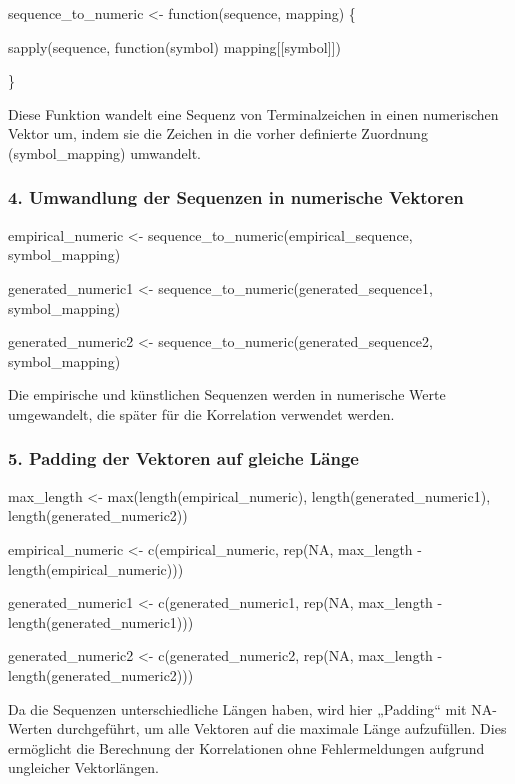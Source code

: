 \documentclass[
]{article}
\begin{document}
sequence\_to\_numeric \textless- function(sequence, mapping) \{

sapply(sequence, function(symbol) mapping{[}{[}symbol{]}{]})

\}

Diese Funktion wandelt eine Sequenz von Terminalzeichen in einen
numerischen Vektor um, indem sie die Zeichen in die vorher definierte
Zuordnung (symbol\_mapping) umwandelt.

\subsubsection{\texorpdfstring{\textbf{4. Umwandlung der Sequenzen in
numerische
Vektoren}}{4. Umwandlung der Sequenzen in numerische Vektoren}}\label{umwandlung-der-sequenzen-in-numerische-vektoren}

empirical\_numeric \textless- sequence\_to\_numeric(empirical\_sequence,
symbol\_mapping)

generated\_numeric1 \textless-
sequence\_to\_numeric(generated\_sequence1, symbol\_mapping)

generated\_numeric2 \textless-
sequence\_to\_numeric(generated\_sequence2, symbol\_mapping)

Die empirische und künstlichen Sequenzen werden in numerische Werte
umgewandelt, die später für die Korrelation verwendet werden.

\subsubsection{\texorpdfstring{\textbf{5. Padding der Vektoren auf
gleiche
Länge}}{5. Padding der Vektoren auf gleiche Länge}}\label{padding-der-vektoren-auf-gleiche-luxe4nge}

max\_length \textless- max(length(empirical\_numeric),
length(generated\_numeric1), length(generated\_numeric2))

empirical\_numeric \textless- c(empirical\_numeric, rep(NA, max\_length
- length(empirical\_numeric)))

generated\_numeric1 \textless- c(generated\_numeric1, rep(NA,
max\_length - length(generated\_numeric1)))

generated\_numeric2 \textless- c(generated\_numeric2, rep(NA,
max\_length - length(generated\_numeric2)))

Da die Sequenzen unterschiedliche Längen haben, wird hier „Padding`` mit
NA-Werten durchgeführt, um alle Vektoren auf die maximale Länge
aufzufüllen. Dies ermöglicht die Berechnung der Korrelationen ohne
Fehlermeldungen aufgrund ungleicher Vektorlängen.
\end{document}
